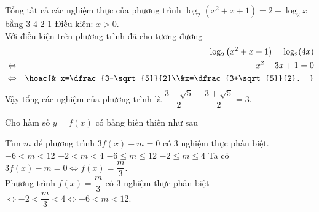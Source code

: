 \begin{ex}%
Tổng tất cả các nghiệm thực của phương trình $\log_{2}\left (x^2+x+1 \right )=2+\log_{2}x$ bằng
\choice 
{\True $3$} 
{$4$}
{$2$} 
{$1$}
\loigiai
{
Điều kiện: $x>0$.\\
Với điều kiện trên phương trình đã cho tương đương
\begin{eqnarray*}
&&\log_{2}\left (x^2+x+1 \right )=\log_{2}(4x)\\
&\Leftrightarrow &x^2-3x+1=0\\
&\Leftrightarrow &\hoac{& x=\dfrac{3-\sqrt{5}}{2}\\&x=\dfrac{3+\sqrt{5}}{2}. }
\end{eqnarray*}
Vậy tổng các nghiệm của phương trình là $\dfrac{3-\sqrt{5}}{2}+\dfrac{3+\sqrt{5}}{2}=3$.
}
\end{ex}

\begin{ex}%
Cho hàm số $y=f(x)$ có bảng biến thiên như sau
\begin{center}
\end{center}
Tìm $m$ để phương trình $3f(x)-m=0$ có $3$ nghiệm thực phân biệt.
\choice 
{\True $-6<m<12$} 
{$-2<m<4$}
{$-6\le m\le 12$} 
{$-2\le m\le 4$}
\loigiai
{
Ta có $3f(x)-m=0\Leftrightarrow f(x)=\dfrac{m}{3}$.\\
Phương trình $f(x)=\dfrac{m}{3}$ có $3$ nghiệm thực phân biệt $\Leftrightarrow -2<\dfrac{m}{3}<4\Leftrightarrow -6<m<12$.
}
\end{ex}

